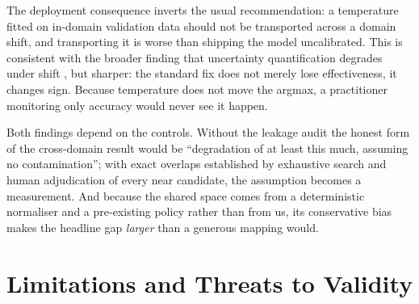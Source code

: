 \documentclass[runningheads]{llncs}
\begin{document}
The deployment consequence inverts the usual recommendation: a temperature
fitted on in-domain validation data should not be transported across a domain
shift, and transporting it is worse than shipping the model uncalibrated. This
is consistent with the broader finding that uncertainty quantification degrades
under shift \cite{ovadia2019trust}, but sharper: the standard fix does not
merely lose effectiveness, it changes sign. Because temperature does not move
the argmax, a practitioner monitoring only accuracy would never see it happen.

Both findings depend on the controls. Without the leakage audit the honest form
of the cross-domain result would be ``degradation of at least this much, assuming
no contamination''; with \NLeakExactCore{} exact overlaps established by
exhaustive search and human adjudication of every near candidate, the assumption
becomes a measurement. And because the shared space comes from a deterministic
normaliser and a pre-existing policy rather than from us, its conservative bias
makes the headline gap \emph{larger} than a generous mapping would.

\section{Limitations and Threats to Validity}
\label{sec:limitations}
\end{document}
